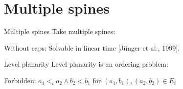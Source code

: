 \section{Multiple spines}

\begin{frame}{Multiple spines}
Take multiple spines:

Without caps: Solvable in linear time [Jünger et al., 1999].
\end{frame}

\begin{frame}{Level planarity}
Level planarity is an ordering problem:
\begin{figure}[\placement]
\centering

\end{figure}
Forbidden: $a_1 <_i a_2 \land b_2 < b_1$ for $(a_1, b_1), (a_2, b_2) \in E_i$ 
\end{frame}

%

